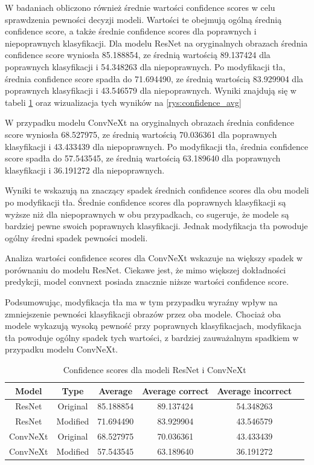 W badaniach obliczono również średnie wartości confidence scores w celu sprawdzenia pewności decyzji modeli. Wartości te obejmują ogólną średnią confidence score, a także średnie confidence scores dla poprawnych i niepoprawnych klasyfikacji. 
Dla modelu ResNet na oryginalnych obrazach średnia confidence score wyniosła 85.188854, ze średnią wartością 89.137424 dla poprawnych klasyfikacji i 54.348263 dla niepoprawnych. Po 
modyfikacji tła, średnia confidence score spadła do 71.694490, ze średnią wartością 83.929904 dla poprawnych klasyfikacji i 43.546579 dla niepoprawnych. Wyniki znajdują się w tabeli \ref*{tab:model_confidence} oraz wizualizacja tych wyników na 
\ref*{rys:confidence_avg}

W przypadku modelu ConvNeXt na oryginalnych obrazach średnia confidence score wyniosła 68.527975, ze średnią wartością 70.036361 dla poprawnych klasyfikacji i 43.433439 dla niepoprawnych. Po modyfikacji tła, średnia confidence score spadła 
do 57.543545, ze średnią wartością 63.189640 dla poprawnych klasyfikacji i 36.191272 dla niepoprawnych.

Wyniki te wskazują na znaczący spadek średnich confidence scores dla obu modeli po modyfikacji tła. Średnie confidence scores dla poprawnych klasyfikacji są wyższe niż dla niepoprawnych w obu przypadkach, co sugeruje, że modele są bardziej 
pewne swoich poprawnych klasyfikacji. Jednak modyfikacja tła powoduje ogólny średni spadek pewności modeli. 

Analiza wartości confidence scores dla ConvNeXt wskazuje na większy spadek w porównaniu do modelu ResNet. Ciekawe jest, że mimo większej dokładności predykcji, model convnext posiada znacznie niższe wartości confidence score. 

Podsumowując, modyfikacja tła ma w tym przypadku wyraźny wpływ na zmniejszenie pewności klasyfikacji obrazów przez oba modele. Chociaż oba modele wykazują wysoką pewność przy poprawnych klasyfikacjach, modyfikacja tła powoduje ogólny spadek 
tych wartości, z bardziej zauważalnym spadkiem w przypadku modelu ConvNeXt. 

\begin{table}
	\centering
	\begin{tabular}{|c|c|c|c|c|c|}
		\hline
		\textbf{Model} & \textbf{Type} & \textbf{Average} & 
		\textbf{Average correct} & \textbf{Average incorrect} \\
		\hline
		ResNet & Original & 85.188854 & 89.137424 & 54.348263 \\
		\hline
		ResNet & Modified & 71.694490 & 83.929904 & 43.546579  \\
		\hline
		ConvNeXt & Original & 68.527975 & 70.036361 & 43.433439 \\
		\hline
		ConvNeXt & Modified & 57.543545 & 63.189640 & 36.191272 \\
		\hline
	\end{tabular}
	\caption{Confidence scores dla modeli ResNet i ConvNeXt}
	\label{tab:model_confidence}
\end{table}

